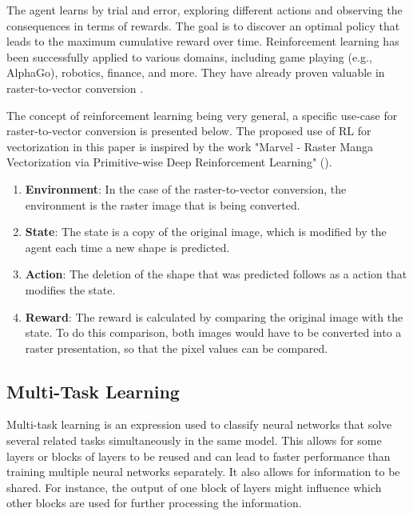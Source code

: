 \documentclass[12pt, a4paper, titlepage]{report}
\begin{document}
The agent learns by trial and error, exploring different actions and observing the consequences in terms of rewards. The goal is to discover an optimal policy that leads to the maximum cumulative reward over time. Reinforcement learning has been successfully applied to various domains, including game playing (e.g., AlphaGo), robotics, finance, and more. They have already proven valuable in raster-to-vector conversion \cite{su_marvel_2023}.

The concept of reinforcement learning being very general, a specific use-case for raster-to-vector conversion is presented below. The proposed use of RL for vectorization in this paper is inspired by the work "Marvel - Raster Manga Vectorization via Primitive-wise Deep Reinforcement Learning"  (\cite{su_marvel_2023}).

\begin{enumerate}[label=\Roman*.]
   \item \textbf{Environment}: In the case of the raster-to-vector conversion, the environment is the raster image that is being converted.

   \item \textbf{State}: The state is a copy of the original image, which is modified by the agent each time a new shape is predicted.

   \item \textbf{Action}: The deletion of the shape that was predicted follows as a action that modifies the state.

   \item \textbf{Reward}: The reward is calculated by comparing the original image with the state. To do this comparison, both images would have to be converted into a raster presentation, so that the pixel values can be compared.
\end{enumerate}

\subsection{Multi-Task Learning}

Multi-task learning is an expression used to classify neural networks that solve several related tasks simultaneously in the same model. This allows for some layers or blocks of layers to be reused and can lead to faster performance than training multiple neural networks separately. It also allows for information to be shared. For instance, the output of one block of layers might influence which other blocks are used for further processing the information.
\end{document}
